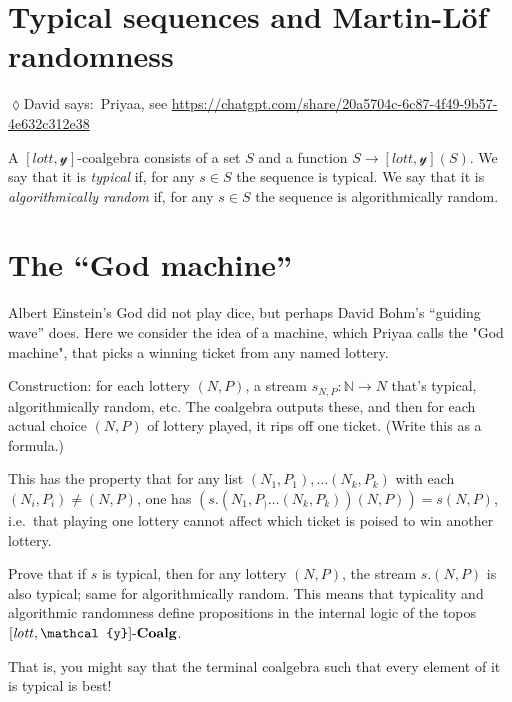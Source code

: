 \documentclass[11pt]{article}
\newcommand{\Cat}[1]{\mathbf{#1}}%
\newcommand{\tn}[1]{\textnormal{#1}}
\newcommand{\nn}{\mathbb{N}}
\newcommand{\coalg}{\tn{-}\Cat{Coalg}}
\newcommand{\lott}{\mathit{lott}}
\newcommand{\yon}{\mathcal{y}}
\newcommand{\dnote}[1]{{\quad \color{blue}$\lozenge$\;David says:}~#1\;{\color{blue}$\lozenge$}\quad}
\begin{document}
\section{Typical sequences and Martin-L\"of randomness}

\dnote{Priyaa, see \url{https://chatgpt.com/share/20a5704c-6c87-4f49-9b57-4e632c312e38}}

A $[\lott,\yon]$-coalgebra consists of a set $S$ and a function $S\to[\lott,\yon](S)$. We say that it is \emph{typical} if, for any $s\in S$ the sequence is typical. We say that it is \emph{algorithmically random} if, for any $s\in S$ the sequence is algorithmically random.




\section{The ``God machine''}

Albert Einstein's God did not play dice, but perhaps David Bohm's ``guiding wave'' does. Here we consider the idea of a machine, which Priyaa calls the "God machine", that picks a winning ticket from any named lottery. 

Construction: for each lottery $(N,P)$, a stream $s_{N,P}:\nn\to N$ that's typical, algorithmically random, etc. The coalgebra outputs these, and then for each actual choice $(N,P)$ of lottery played, it rips off one ticket. (Write this as a formula.)

This has the property that for any list $(N_1,P_1),\ldots(N_k,P_k)$ with each $(N_i,P_i)\neq (N,P)$, one has $(s.(N_1,P_)\ldots(N_k,P_k))(N,P))=s(N,P)$, i.e.\ that playing one lottery cannot affect which ticket is poised to win another lottery. 

Prove that if $s$ is typical, then for any lottery $(N,P)$, the stream $s.(N,P)$ is also typical; same for algorithmically random. This means that typicality and algorithmic randomness define propositions in the internal logic of the topos $[\lott,\yon]\coalg$.

That is, you might say that the terminal coalgebra such that every element of it is typical is best!
\end{document}
